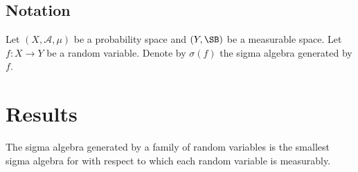 \subsection*{Notation}

Let $(X, \mathcal{A} , \mu )$ be a probability space and $(Y, \SB)$ be a measurable space.
Let $f: X \to Y$ be a random variable.
Denote by $\sigma (f)$ the sigma algebra generated by $f$.

\section*{Results}

\begin{proposition}
The sigma algebra generated by a family of random variables is the smallest sigma algebra for with respect to which each random variable is measurably.
\end{proposition}

